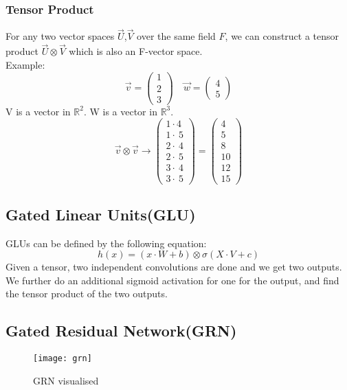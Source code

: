 \documentclass{article}
\begin{document}
\subsubsection{Tensor Product}
For any two vector spaces $\vec{U}$,$\vec{V}$ over the same field $F$, we can construct a tensor product $\vec{U}\otimes\vec{V}$ which is also an F-vector space.\\
Example:
$$\vec{v}=\begin{pmatrix}1\\ 2\\ 3\end{pmatrix}\quad \vec{w}=\begin{pmatrix}4\\ 5\end{pmatrix}$$
V is a vector in $\mathbb{R}^{2}$. W is a vector in $\mathbb{R}^{3}$.
$$\vec{v}\otimes\vec{v} \rightarrow \begin{pmatrix}1\cdot 4\\ 1\cdot \:5\\ 2\cdot \:4\\ 2\cdot \:5\\ 3\cdot \:4\\ 3\cdot \:5\end{pmatrix}=\begin{pmatrix}4\\ 5\\ 8\\ 10\\ 12\\ 15\end{pmatrix}$$

\subsection{Gated Linear Units(GLU)}
GLUs can be defined by the following equation:
$$h(x)=(x\cdot W +b)\otimes \sigma(X\cdot V+c)$$
Given a tensor, two independent convolutions are done and we get two outputs. We further do an additional sigmoid activation for one for the output, and find the tensor product of the two outputs.


\subsection{Gated Residual Network(GRN)}
\begin{figure}[H]
    \centering
    \texttt{[image: grn]}
    \caption{GRN visualised}
\end{figure}
\end{document}
